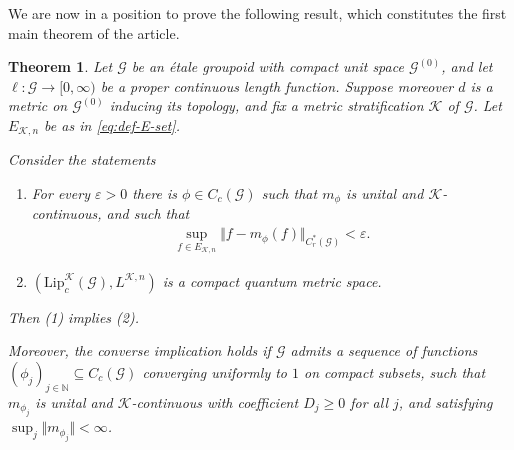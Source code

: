 \documentclass[11pt,a4paper,oneside,final,reqno]{amsart}
\newtheorem{theorem}[lemma]{Theorem}
\theoremstyle{definition}
\newcommand{\G}{\mathcal{G}}
\newcommand{\Go}{\mathcal{G}^{(0)}}
\newcommand{\cK}{\mathcal{K}}
\newcommand{\Lip}{\mathrm{Lip}}
\newcommand{\Cred}{C_{r}^{*}}
\newcommand{\N}{\mathbb{N}}
\numberwithin{equation}{section}
\begin{document}
	We are now in a position to prove the following result, which 
	constitutes the first main theorem of the article. 

	\begin{theorem}\label{thm:new-characterization}
		Let $\G$ be an \'etale groupoid with compact unit space $\Go$, and let $\ell \colon \G \to [0,\infty)$ be a proper continuous length function. 
		Suppose moreover $d$ is a metric on $\Go$ inducing its topology, and fix a metric stratification $\cK$ of $\G$.
		Let $E_{\cK, n}$ be as in \eqref{eq:def-E-set}. 
		
		Consider the statements
		\begin{enumerate}
			\item 
			For every $\varepsilon > 0$ there is 
			$\phi \in C_c(\G)$ 
			such that $m_\phi$ is unital and $\cK$-continuous, and such that
			\begin{align}\label{eq:norm-approximation-yields-CQMS}
				\sup_{f\in E_{\cK, n}} \Vert f - m_{\phi}(f) \Vert_{\Cred(\G)} < \varepsilon.
			\end{align}
			\item $( \Lip_c^{\cK}(\G), L^{\cK,n})$  
			is a compact quantum metric space.
		\end{enumerate}
		Then (1) implies (2). 
		

		
		Moreover, the converse implication holds if $\G$ admits a sequence of functions
		$(\phi_j)_{j \in \N} \subseteq C_c(\G)$ converging uniformly to $1$ on compact subsets, 
		such that $m_{\phi_j}$ is unital and $\cK$-continuous with coefficient 
		$D_j \geq 0$
		for all $j$, and
		satisfying $\sup_j \Vert m_{\phi_j} \Vert < \infty$.
		
	\end{theorem}
	
\end{document}
